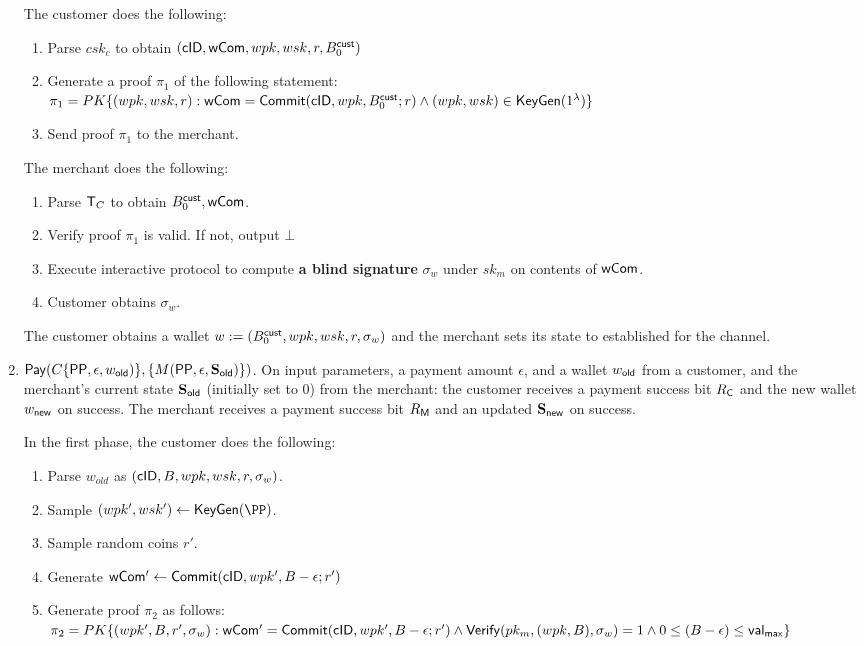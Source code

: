 \documentclass[11pt]{report}
\newcommand{\BC}{B^{\text{\sf cust}}_{\text{0}}}
\begin{document}
\begin{enumerate}
\medskip \noindent
The customer does the following:
\begin{enumerate}
\item Parse $csk_c$ to obtain $({\sf cID}, {\sf wCom}, wpk, wsk, r, \BC)$
\item Generate a proof $\pi_1$ of the following statement: \\
$\pi_1 = PK\{ (wpk, wsk, r) : {\sf wCom} = {\sf Commit}({\sf cID}, wpk, \BC; r) \wedge (wpk, wsk) \in {\sf KeyGen}(1^\lambda)\}$
\item Send proof $\pi_1$ to the merchant.
\end{enumerate}

\medskip \noindent
The merchant does the following:
\begin{enumerate}
\item Parse ${\sf T}_{C}$ to obtain $\BC, {\sf wCom}$.
\item Verify proof $\pi_1$ is valid. If not, output $\bot$
\item Execute interactive protocol to compute {\bf a blind signature} $\sigma_w$ under $sk_m$ on contents of ${\sf wCom}$.
\item Customer obtains $\sigma_w$.
\end{enumerate}

\medskip \noindent
The customer obtains a wallet $w := (\BC, wpk, wsk, r, \sigma_w)$ and the merchant sets its state to {\sf established} for the channel.


\item ${\sf Pay}( C\{{\sf PP}, \epsilon, w_{\sf old})\}, \{M({\sf PP}, \epsilon, {\bf S}_{\sf old})\})$. On input parameters, a payment amount $\epsilon$, and a wallet $w_{\sf old}$ from a customer, and the merchant's current state ${\bf S}_{\sf old}$ (initially set to $0$) from the merchant: the customer receives a payment success bit $R_{\sf C}$ and the new wallet $w_{\sf new}$ on success. The merchant receives a payment success bit $R_{\sf M}$ and an updated ${\bf S}_{\sf new}$ on success.

\medskip \noindent
In the first phase, the customer does the following:
\begin{enumerate}
\item Parse $w_{old}$ as $({\sf cID}, B, wpk, wsk, r, \sigma_w)$.
\item Sample $(wpk', wsk') \leftarrow {\sf KeyGen}(\PP)$.
\item Sample random coins $r'$.
\item Generate ${\sf wCom'} \leftarrow {\sf Commit}({\sf cID}, wpk', B - \epsilon; r')$
\item Generate proof $\pi_2$ as follows:
\\ $\pi_2 = PK\{ (wpk', B, r', \sigma_w) : {\sf wCom'} = {\sf Commit}({\sf cID}, wpk', B - \epsilon; r') 
\\  \wedge {\sf Verify}(pk_m, (wpk, B), \sigma_w) = 1
\\ \wedge 0 \leq (B - \epsilon) \leq {\sf val}_{\sf max} \}$


\end{enumerate}
\end{enumerate}
\end{document}

